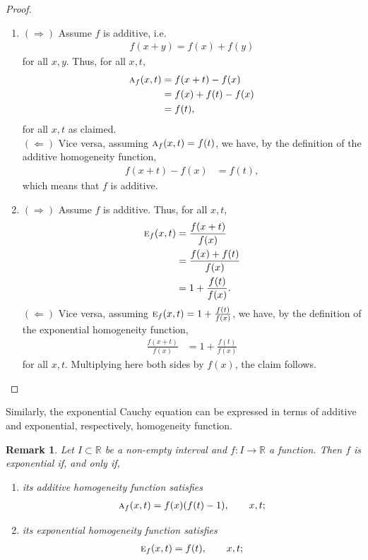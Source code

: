 \documentclass{amsart}
\theoremstyle{plain}
\newtheorem{remark}{Remark}
\numberwithin{equation}{section}
\newcommand{\eh}{\textsc{e}}
\newcommand{\R}{{\mathbb{R}}}
\begin{document}
\begin{proof}
    \begin{enumerate}
    \item
    \textbf{$(\Rightarrow)$} 
    Assume $f$ is additive, i.e.
\begin{align*}
f(x+y)= f(x) + f(y)  
\end{align*}
for all $x,y$.
 Thus, for all $x,t$,
\begin{align*}
\textsc{a}_f (x,t) &= f(x+t)-f(x)\\
&=
f(x)+f(t)-f(x) \\
&=
f(t),
\end{align*}
 for all $x,t$ as claimed. \\
\textbf{$(\Leftarrow)$} Vice versa, assuming $\textsc{a}_f (x,t)=f(t)$, we have, by the definition of the additive homogeneity function,
\begin{align*}
f(x+t)-f(x)
&=
f(t),
\end{align*}
which means that $f$ is additive.
\item
 \textbf{$(\Rightarrow)$} 
    Assume $f$ is additive.
Thus, for all $x,t$,
\begin{align*}
\eh_f (x,t) &= \frac{f(x+t)}{f(x)}\\
&=
\frac{f(x)+ f(t)}{f(x)} \\
&=
1+ \frac{f(t)}{f(x)}.
\end{align*}
  \textbf{$(\Leftarrow)$}   Vice versa, assuming $\eh_f (x,t)= 1+ \frac{f(t)}{f(x)}$,
     we have, by the definition of the exponential homogeneity function,
\begin{align*}
\frac{f(x+t)}{f(x)}
&=
1+ \frac{f(t)}{f(x)}
\end{align*}
for all $x,t$.
Multiplying here both sides by $f(x)$, the claim follows.
\end{enumerate}
\end{proof}
%
Similarly, the exponential Cauchy equation can be expressed in terms of
additive and exponential, respectively, homogeneity function.
\begin{remark}
Let $I \subset \R$ be a non-empty interval and $f: I \to \R$ a function.
Then $f$ is exponential if, and only if,
\begin{enumerate}
    \item 
its additive homogeneity function satisfies
\begin{align*}
\textsc{a}_f (x,t) =f(x) (f(t)-1), \qquad x,t;   
\end{align*}

\item 
its exponential homogeneity function satisfies
\begin{align*}
\eh_f (x,t) = f(t), \qquad x,t;   
\end{align*}
\end{enumerate}
\end{remark}
\end{document}
